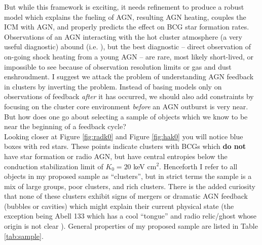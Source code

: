 \documentclass[11pt]{article}
\begin{document}
But while this framework is exciting, it needs refinement to produce a
robust model which explains the fueling of AGN, resulting AGN heating,
couples the ICM with AGN, and properly predicts the effect on
BCG star formation rates. Observations of an AGN interacting with the
hot cluster atmosphere (a very useful diagnostic) abound
(i.e. \cite{2004ApJ...607..800B}), but the best diagnostic -- direct
observation of on-going shock heating from a young AGN -- are rare, 
most likely short-lived, or impossible to see because of observation
resolution limits or gas and dust enshroudment. I suggest we attack
the problem of understanding AGN feedback in clusters by inverting the
problem. Instead of basing models only on observations of feedback
{\it after} it has occurred, we should also add constraints by
focusing on the cluster core environment {\it before} an AGN outburst
is very near. But how does one go about selecting a sample of objects
which we know to be near the beginning of a feedback cycle?\\

Looking closer at Figure \ref{fig:radk0} and Figure \ref{fig:hak0} you
will notice blue boxes with red stars. These points indicate clusters
with BCGs which {\bf do not} have star formation or radio AGN, but
have central entropies below the conduction stabilization limit of $K_0
= 20$ keV cm$^2$. Henceforth I refer to all objects in my proposed
sample as ``clusters'', but in strict terms the sample is a mix of
large groups, poor clusters, and rich clusters. There is the added
curiosity that none of these clusters exhibit signs of mergers or
dramatic AGN feedback (bubbles or cavities) which might explain their
current physical state (the exception being Abell 133 which has a cool
``tongue'' and radio relic/ghost whose origin is not clear
\cite{2004ApJ...616..157F}). General properties of my proposed sample
are listed in Table \ref{tab:sample}.\\
\end{document}
